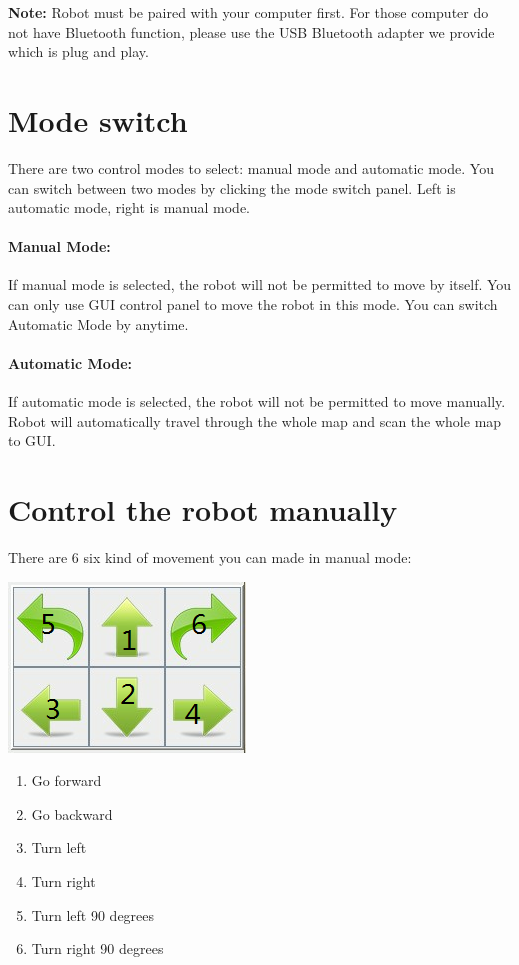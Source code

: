 \documentclass[11pt, a4paper]{report}
\begin{document}
\noindent\textbf {Note: } Robot must be paired with your computer first. For those computer do not have Bluetooth function, please use the USB Bluetooth adapter we provide which is plug and play.

\section{Mode switch}
There are two control modes to select: manual mode and automatic mode. You can switch between two modes by clicking the mode switch panel. Left is automatic mode, right is manual mode.\\

\paragraph{Manual Mode:}
If manual mode is selected, the robot will not be permitted to move by itself. You can only use GUI control panel to move the robot in this mode. You can switch Automatic Mode by anytime.\\ 

\paragraph{Automatic Mode:}
If automatic mode is selected, the robot will not be permitted to move manually. Robot will automatically travel through the whole map and scan the whole map to GUI. 

\section{Control the robot manually}
There are 6 six kind of movement you can made in manual mode:
\begin{center}
\includegraphics[scale=1]{./image/ControlPanelMark.png}\\[1cm]
\end{center}
\begin{enumerate}

	\item Go forward
	\item Go backward
	\item Turn left
	\item Turn right
	\item Turn left 90 degrees
	\item Turn right 90 degrees
\end{enumerate}
\end{document}
